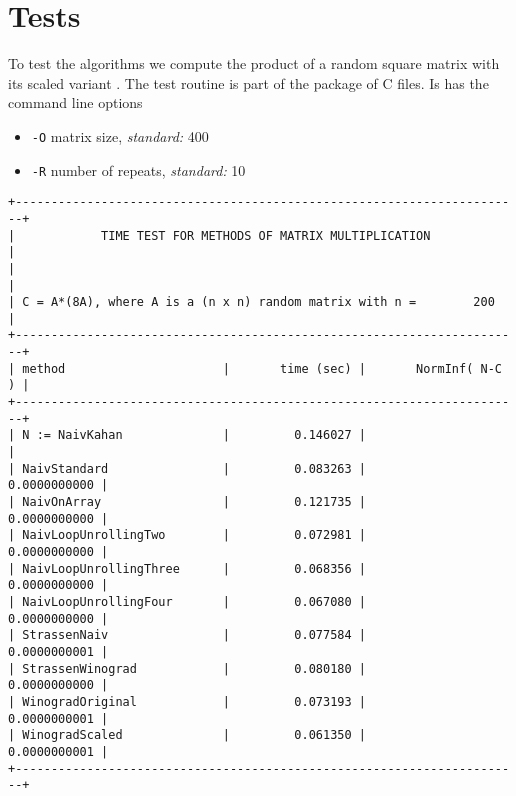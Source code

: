 \documentclass{amsart}
\newcommand{\CODE}[2]{}
\newcommand{\CODElast}[3]{}
\begin{document}
{\CODE{StrassenWinograd.c}{229}
\CODElast{StrassenWinograd.c}{3}{225}

































\newpage\section{Tests}

To test the algorithms we compute the product of a random square matrix  with its scaled variant . The test routine is part of the package of C files. Is has the command line options
\begin{itemize}
\item \texttt{-O} matrix size, \emph{standard:} 400
\item \texttt{-R} number of repeats, \emph{standard:} 10
\end{itemize}

\begin{verbatim}
+-----------------------------------------------------------------------+
|            TIME TEST FOR METHODS OF MATRIX MULTIPLICATION             |
|                                                                       |
| C = A*(8A), where A is a (n x n) random matrix with n =        200    |
+-----------------------------------------------------------------------+
| method                      |       time (sec) |       NormInf( N-C ) |
+-----------------------------------------------------------------------+
| N := NaivKahan              |         0.146027 |                      |
| NaivStandard                |         0.083263 |         0.0000000000 |
| NaivOnArray                 |         0.121735 |         0.0000000000 |
| NaivLoopUnrollingTwo        |         0.072981 |         0.0000000000 |
| NaivLoopUnrollingThree      |         0.068356 |         0.0000000000 |
| NaivLoopUnrollingFour       |         0.067080 |         0.0000000000 |
| StrassenNaiv                |         0.077584 |         0.0000000001 |
| StrassenWinograd            |         0.080180 |         0.0000000000 |
| WinogradOriginal            |         0.073193 |         0.0000000001 |
| WinogradScaled              |         0.061350 |         0.0000000001 |
+-----------------------------------------------------------------------+


\end{verbatim}}
\end{document}
